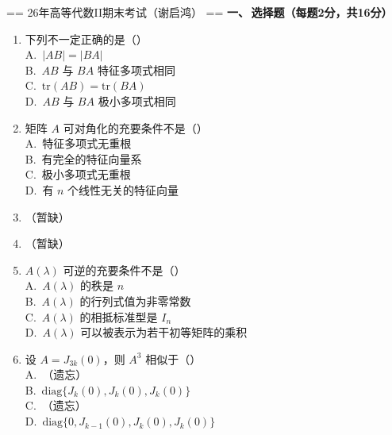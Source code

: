 

== 26年高等代数II期末考试（谢启鸿） ==
\textbf{一、\,选择题（每题2分，共16分）}

\begin{enumerate}
    \item 下列不一定正确的是（\quad）\\
          A.\ $|AB|=|BA|$ \\ 
          B.\ $AB$ 与 $BA$ 特征多项式相同 \\ 
          C.\ $\mathrm{tr}(AB)=\mathrm{tr}(BA)$ \\ 
          D.\ $AB$ 与 $BA$ 极小多项式相同

    \item 矩阵 $A$ 可对角化的充要条件不是（\quad）\\
          A.\ 特征多项式无重根 \\ 
          B.\ 有完全的特征向量系  \\ 
          C.\ 极小多项式无重根 \\ 
          D.\ 有 $n$ 个线性无关的特征向量

    \item （暂缺）

    \item （暂缺）

    \item $A(\lambda)$ 可逆的充要条件不是（\quad）\\
          A.\ $A(\lambda)$ 的秩是 $n$ \\ 
          B.\ $A(\lambda)$ 的行列式值为非零常数 \\ 
          C.\ $A(\lambda)$ 的相抵标准型是 $I_n$ \\ 
          D.\ $A(\lambda)$ 可以被表示为若干初等矩阵的乘积

    \item 设 $A=J_{3k}(0)$，则 $A^3$ 相似于（\quad）\\
          A.\ （遗忘）\\ 
          B.\ $\mathrm{diag}\{J_k(0),J_k(0),J_k(0)\}$ \\
          C.\ （遗忘） \\ 
          D.\ $\mathrm{diag}\{0,J_{k-1}(0),J_k(0),J_k(0)\}$


\end{enumerate}
